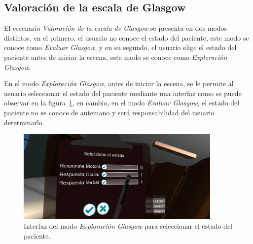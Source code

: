 \subsection{Valoración de la escala de Glasgow}

El escenario \emph{Valoración de la escala de Glasgow} se presenta en dos modos
distintos, en el primero, el usuario no conoce el estado del paciente, este modo
se conoce como \emph{Evaluar Glasgow}, y en su segundo, el usuario elige el
estado del paciente antes de iniciar la escena, este modo se conoce como
\emph{Exploración Glasgow}. 


En el modo \emph{Exploración Glasgow}, antes de iniciar la escena, se le
permite al usuario seleccionar el estado del paciente mediante una interfaz 
como se puede observar en la figura~\ref{fig:glasgow_seleccion}, en
cambio, en el modo \emph{Evaluar Glasgow}, el estado del paciente no se conoce
de antemano y será responsabilidad del usuario determinarlo.

\begin{figure}[H]
\centering
\includegraphics[width=10cm]{solucion/images/glasgow_seleccion.jpg}
\caption{Interfaz del modo \emph{Exploración Glasgow} para seleccionar el estado del 
paciente.}
\label{fig:glasgow_seleccion}
\end{figure}





